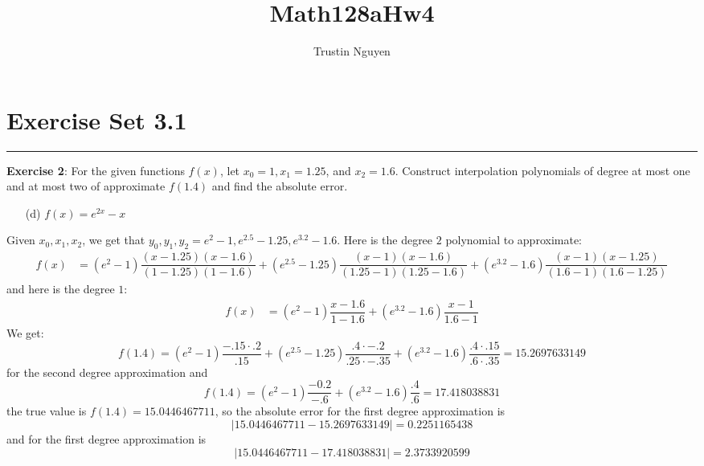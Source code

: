 \documentclass{article}
\title{Math128aHw4}
\author{Trustin Nguyen}
\begin{document}
    \maketitle

\reversemarginpar

\section*{Exercise Set 3.1}
\hrule

\textbf{Exercise 2}: For the given functions $f(x)$, let $x_{0} = 1, x_{1} = 1.25$, and $x_{2} = 1.6$. Construct interpolation polynomials of degree at most one and at most two of approximate $f(1.4)$ and find the absolute error.
    \begin{itemize}
        \item [(d)] $f(x) = e^{2x} - x$ 
    \end{itemize}
    \begin{answer}
        Given $x_{0}, x_{1}, x_{2}$, we get that $y_{0}, y_{1}, y_{2} = e^{2} - 1, e^{2.5} - 1.25, e^{3.2} - 1.6$. Here is the degree $2$ polynomial to approximate:
            \begin{align*}
                f(x) &= (e^{2} - 1)\dfrac{(x - 1.25)(x - 1.6)}{(1 - 1.25)(1 - 1.6)} + (e^{2.5} - 1.25)\dfrac{(x - 1)(x - 1.6)}{(1.25 - 1)(1.25 - 1.6)} + (e^{3.2} - 1.6)\dfrac{(x - 1)(x - 1.25)}{(1.6 - 1)(1.6 - 1.25)}
            \end{align*}
        and here is the degree $1$:
            \begin{align*}
                f(x) &= (e^{2} - 1)\dfrac{x - 1.6}{1 - 1.6} + (e^{3.2} - 1.6)\dfrac{x - 1}{1.6 - 1}   
            \end{align*}
        We get:
            \begin{equation*}
                f(1.4) = (e^{2} - 1)\dfrac{-.15 \cdot .2}{.15} + (e^{2.5} - 1.25) \dfrac{.4 \cdot -.2}{.25 \cdot -.35} + (e^{3.2} - 1.6) \dfrac{.4 \cdot .15}{.6 \cdot .35} = 15.2697633149
            \end{equation*}
        for the second degree approximation and
            \begin{equation*}
                f(1.4) = (e^{2} - 1) \dfrac{-0.2}{-.6} + (e^{3.2} - 1.6) \dfrac{.4}{.6} = 17.418038831
            \end{equation*}
        the true value is $f(1.4) = 15.0446467711$, so the absolute error for the first degree approximation is
            \begin{equation*}
                \lvert 15.0446467711 - 15.2697633149 \rvert = 0.2251165438
            \end{equation*}
        and for the first degree approximation is
            \begin{equation*}
                \lvert 15.0446467711 - 17.418038831 \rvert = 2.3733920599
            \end{equation*}
    \end{answer}
\end{document}
